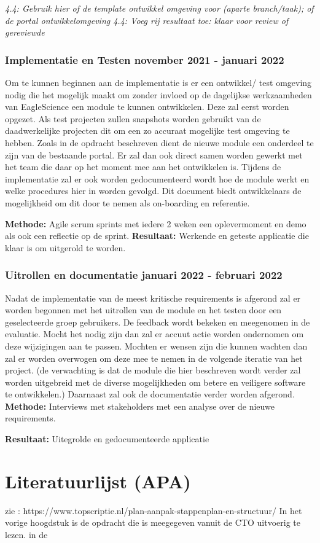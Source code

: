    \textit{4.4: Gebruik hier of de template ontwikkel omgeving voor (aparte branch/taak); of de portal ontwikkelomgeving
    4.4: Voeg rij resultaat toe: klaar voor review of gereviewde}

    \subsubsection{Implementatie en Testen \textbf{november 2021 - januari 2022 }}\label{sec:implementatie-en-testen}
    Om te kunnen beginnen aan de implementatie is er een ontwikkel/ test omgeving nodig die het mogelijk maakt om zonder invloed op de dagelijkse werkzaamheden van EagleScience een module te kunnen ontwikkelen. Deze zal eerst worden opgezet. Als test projecten zullen snapshots worden gebruikt van de daadwerkelijke projecten dit om een zo accuraat mogelijke test omgeving te hebben. Zoals in de opdracht beschreven dient de nieuwe module een onderdeel te zijn van de bestaande portal. Er zal dan ook direct samen worden gewerkt met het team die daar op het moment mee aan het ontwikkelen is. Tijdens de implementatie zal er ook worden gedocumenteerd wordt hoe de module werkt en welke procedures hier in worden gevolgd. Dit document biedt ontwikkelaars de mogelijkheid om dit door te nemen als on-boarding en referentie.

    \textbf{Methode:} Agile scrum sprints met iedere 2 weken een oplevermoment en demo als ook een reflectie op de sprint.
    \textbf{Resultaat:} Werkende en geteste applicatie die klaar is om uitgerold te worden.

    \subsubsection{Uitrollen en documentatie \textbf{januari 2022 - februari 2022 }}\label{sec:uitrollen-en-documentatie}
    Nadat de implementatie van de meest kritische requirements is afgerond zal er worden begonnen met het uitrollen van de module en het testen door een geselecteerde groep gebruikers. De feedback wordt bekeken en meegenomen in de evaluatie. Mocht het nodig zijn dan zal er accuut actie worden ondernomen om deze wijzigingen aan te passen. Mochten er wensen zijn die kunnen wachten dan zal er worden overwogen om deze mee te nemen in de volgende iteratie van het project. (de verwachting is dat de module die hier beschreven wordt verder zal worden uitgebreid met de diverse mogelijkheden om betere en veiligere software te ontwikkelen.) Daarnaast zal ook de documentatie verder worden afgerond.
    \textbf{Methode:} Interviews met stakeholders met een analyse over de nieuwe requirements.

    \textbf{Resultaat:} Uitegrolde en gedocumenteerde applicatie


    \section{Literatuurlijst (APA)}

    zie : https://www.topscriptie.nl/plan-aanpak-stappenplan-en-structuur/
    In het vorige hoogdstuk is de opdracht die is meegegeven vanuit de CTO uitvoerig te lezen. in de






